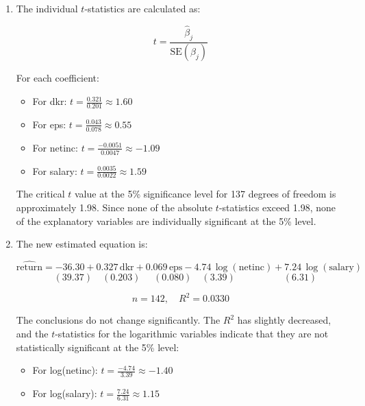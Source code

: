 \documentclass[12pt]{article}
\begin{document}
\begin{enumerate}
{\begin{enumerate}
\[
F = \frac{(0.0395 / 4)}{((1 - 0.0395) / (142 - 4 - 1))} = \frac{0.009875}{\frac{0.9605}{137}} \approx \frac{0.009875}{0.00701} \approx 1.41
\]

The critical $F$ value for $k = 4$ and $n - k - 1 = 137$ at the 5\% significance level is approximately 2.45. Since $F = 1.41 < 2.45$, we fail to reject the null hypothesis that the coefficients are jointly zero. Therefore, the explanatory variables are not jointly significant.

\item The individual $t$-statistics are calculated as:

\[
t = \frac{\hat{\beta}_j}{\text{SE}(\hat{\beta}_j)}
\]

For each coefficient:
\begin{itemize}
    \item For dkr: $t = \frac{0.321}{0.201} \approx 1.60$
    \item For eps: $t = \frac{0.043}{0.078} \approx 0.55$
    \item For netinc: $t = \frac{-0.0051}{0.0047} \approx -1.09$
    \item For salary: $t = \frac{0.0035}{0.0022} \approx 1.59$
\end{itemize}

The critical $t$ value at the 5\% significance level for 137 degrees of freedom is approximately 1.98. Since none of the absolute $t$-statistics exceed 1.98, none of the explanatory variables are individually significant at the 5\% level.

\item The new estimated equation is:

\[
\widehat{\text{return}} = -36.30 + 0.327\, \text{dkr} + 0.069\, \text{eps} - 4.74\, \log(\text{netinc}) + 7.24\, \log(\text{salary})
\]
\[
\quad (39.37) \quad (0.203) \,\,\quad (0.080) \quad (3.39) \quad\quad\quad\quad\quad (6.31)
\]

\[
n = 142, \quad R^2 = 0.0330
\]

The conclusions do not change significantly. The $R^2$ has slightly decreased, and the $t$-statistics for the logarithmic variables indicate that they are not statistically significant at the 5\% level:

\begin{itemize}
    \item For log(netinc): $t = \frac{-4.74}{3.39} \approx -1.40$
    \item For log(salary): $t = \frac{7.24}{6.31} \approx 1.15$
\end{itemize}


\end{enumerate}}
\end{enumerate}
\end{document}
